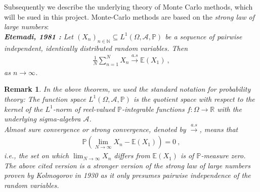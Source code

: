 \documentclass[11pt,a4paper]{article}
\newtheorem{rmk}{Remark}%
\numberwithin{equation}{section}
\begin{document}
%
Subsequently we describe the underlying theory of Monte Carlo methods, which will be sued in this project.
%
Monte-Carlo methods are based on the \textit{strong law of large numbers}:\\

\textit{
\textbf{Etemadi, 1981 \cite{etemadi1981elementary}:} Let $(X_n)_{n\in\mathbb{N}}\subseteq L^1(\Omega, \mathcal{A}, \mathbb{P})$ be a sequence of pairwise independent, identically distributed random variables. Then
\begin{align*}
\frac{1}{N}\sum_{n=1}^NX_n\overset{a.s}{\longrightarrow}\mathbb{E}(X_1)~,
\end{align*}
as $n\to \infty$.
}

\begin{rmk}
In the above theorem, we used the standard notation for probability theory:
%
The function space $L^1(\Omega, \mathcal{A}, \mathbb{P})$ is the quotient space with respect to the kernel of the  ${L^1}$-norm of reel-valued $\mathbb{P}$-integrable functions $f:\Omega \to \mathbb{R}$ with the underlying sigma-algebra $\mathcal{A}$.\\
Almost sure convergence or strong convergence, denoted by $\overset{a.s}{\longrightarrow}$, means that
\begin{align*}
\mathbb{P}\left( \lim_{N\to \infty}X_n -  \mathbb{E}(X_1)\right)=0~,
\end{align*}
i.e., the set on which $\lim_{N\to \infty}X_n$ differs from $\mathbb{E}(X_1)$ is of $\mathbb{P}$-measure zero.\\
The above cited version is a stronger version of the \textit{strong law of large numbers} proven by Kolmogorov in 1930 \cite{kolmogorov1930loi} as it only presumes pairwise independence of the random variables. 
\end{rmk}
\end{document}
